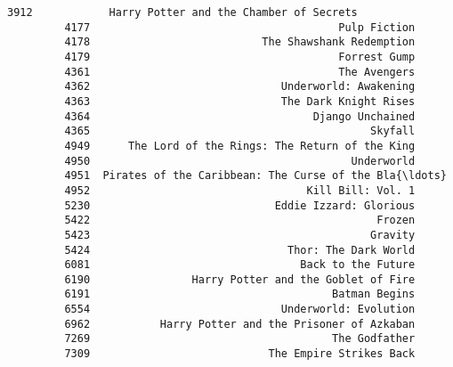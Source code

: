 \documentclass[11pt]{article}
\begin{document}
\begin{Verbatim}[commandchars=\\\{\}]
         3912            Harry Potter and the Chamber of Secrets   
         4177                                       Pulp Fiction   
         4178                           The Shawshank Redemption   
         4179                                       Forrest Gump   
         4361                                       The Avengers   
         4362                              Underworld: Awakening   
         4363                              The Dark Knight Rises   
         4364                                   Django Unchained   
         4365                                            Skyfall   
         4949      The Lord of the Rings: The Return of the King   
         4950                                         Underworld   
         4951  Pirates of the Caribbean: The Curse of the Bla{\ldots}   
         4952                                  Kill Bill: Vol. 1   
         5230                             Eddie Izzard: Glorious   
         5422                                             Frozen   
         5423                                            Gravity   
         5424                               Thor: The Dark World   
         6081                                 Back to the Future   
         6190                Harry Potter and the Goblet of Fire   
         6191                                      Batman Begins   
         6554                              Underworld: Evolution   
         6962           Harry Potter and the Prisoner of Azkaban   
         7269                                      The Godfather   
         7309                            The Empire Strikes Back   
         

\end{Verbatim}
\end{document}
